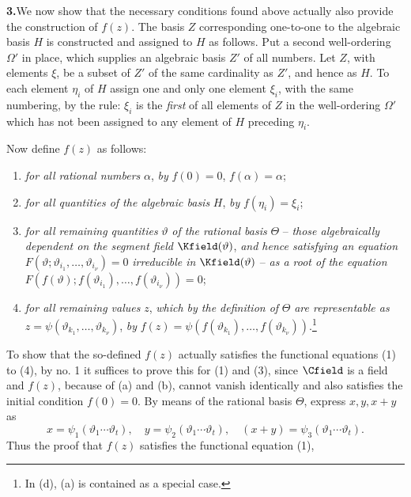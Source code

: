 \medskip
\noindent\textbf{3.}\quad We now show that the necessary conditions found above actually also provide the construction of \(f(z)\). The basis \(Z\) corresponding one-to-one to the algebraic basis \(H\) is constructed and assigned to \(H\) as follows. Put a second well-ordering \(\Omega'\) in place, which supplies an algebraic basis \(Z'\) of all numbers. Let \(Z\), with elements \(\xi\), be a subset of \(Z'\) of the same cardinality as \(Z'\), and hence as \(H\). To each element \(\eta_i\) of \(H\) assign one and only one element \(\xi_i\), with the same numbering, by the rule: \(\xi_i\) is the \emph{first} of all elements of \(Z\) in the well-ordering \(\Omega'\) which has not been assigned to any element of \(H\) preceding \(\eta_i\).

Now define \(f(z)\) as follows:
\begin{enumerate}
\item[(a)] \emph{for all rational numbers} \(\alpha\), \emph{by} \(f(0)=0\), \(f(\alpha)=\alpha\);
\item[(b)] \emph{for all quantities of the algebraic basis} \(H\), \emph{by} \(f(\eta_i)=\xi_i\);
\item[(c)] \emph{for all remaining quantities} \(\vartheta\) \emph{of the rational basis} \(\Theta\) -- \emph{those algebraically dependent on the segment field} \(\Kfield(\vartheta)\), \emph{and hence satisfying an equation} \(F(\vartheta;\vartheta_{i_1},\ldots,\vartheta_{i_\nu})=0\) \emph{irreducible in} \(\Kfield(\vartheta)\) -- \emph{as a root of the equation} \(F(f(\vartheta);f(\vartheta_{i_1}),\ldots,f(\vartheta_{i_\nu}))=0\);
\item[(d)] \emph{for all remaining values} \(z\), \emph{which by the definition of} \(\Theta\) \emph{are representable as} \(z=\psi(\vartheta_{k_1},\ldots,\vartheta_{k_\nu})\), \emph{by} \(f(z)=\psi(f(\vartheta_{k_1}),\ldots,f(\vartheta_{k_\nu}))\).\footnote{In (d), (a) is contained as a special case.}
\end{enumerate}
To show that the so-defined \(f(z)\) actually satisfies the functional equations (1) to (4), by no. 1 it suffices to prove this for (1) and (3), since \(\Cfield\) is a field and \(f(z)\), because of (a) and (b), cannot vanish identically and also satisfies the initial condition \(f(0)=0\). By means of the rational basis \(\Theta\), express \(x,y,x+y\) as
\[
x=\psi_1(\vartheta_1\cdots\vartheta_t),\quad
 y=\psi_2(\vartheta_1\cdots\vartheta_t),\quad
 (x+y)=\psi_3(\vartheta_1\cdots\vartheta_t).
\]
Thus the proof that \(f(z)\) satisfies the functional equation (1),
